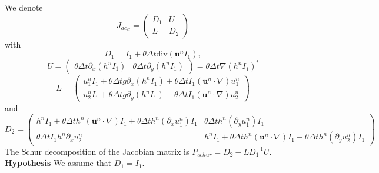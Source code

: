 \documentclass[a4paper, 11pt]{article}
\begin{document}
We denote 
\begin{equation*}
J_{ac_G}=\begin{pmatrix}D_1&U\\L&D_2\end{pmatrix}
\end{equation*}
with
\begin{equation*}
D_1=I_1+\theta\Delta t\text{div}(\boldsymbol{u}^nI_1),
\end{equation*}
\begin{equation*}
U=\begin{pmatrix}\theta\Delta t\partial_x\left(h^nI_1\right)&\theta\Delta t\partial_y\left(h^nI_1\right)\end{pmatrix}=\theta\Delta t\nabla\left(h^nI_1\right)^t
\end{equation*}
\begin{equation*}
L=\begin{pmatrix}
u_1^nI_1+\theta\Delta t g\partial_x(h^nI_1)+\theta\Delta tI_1\left(\boldsymbol{u}^n\cdot\nabla\right)u_1^n\\
u_2^nI_1+\theta\Delta tg\partial_y(h^nI_1)+\theta\Delta tI_1\left(\boldsymbol{u}^n\cdot\nabla\right)u_2^n
\end{pmatrix}
\end{equation*}
and
\begin{equation*}
D_2=\begin{pmatrix}h^nI_1+\theta\Delta th^n\left(\boldsymbol{u}^n\cdot \nabla\right)I_1+\theta\Delta th^n(\partial_xu_1^n)I_1&\theta\Delta th^n(\partial_yu_1^n)I_1\\
\theta\Delta tI_1h^n\partial_xu_2^n&h^nI_1+\theta\Delta th^n\left(\boldsymbol{u}^n\cdot\nabla\right)I_1+\theta\Delta th^n(\partial_yu_2^n)I_1
\end{pmatrix}
\end{equation*}
The Schur decomposition of the Jacobian matrix is $P_{schur}=D_2-LD_1^{-1}U$.\\
\textbf{Hypothesis} We assume that $D_1=I_1$.\\
\end{document}
